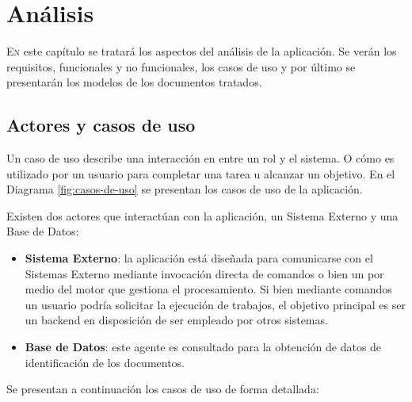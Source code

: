 
\chapter{Análisis}
\label{chap:analisis}

\lettrine{E}{n} este capítulo se tratará los aspectos del análisis de la aplicación. Se verán los requisitos, funcionales y no funcionales, los casos de uso y por último se presentarán los modelos de los documentos tratados.

\section{Actores y casos de uso}

Un caso de uso describe una interacción en entre un rol y el sistema. O cómo es utilizado por un usuario para completar una tarea u alcanzar un objetivo. En el Diagrama \ref{fig:casos-de-uso} se presentan los casos de uso de la aplicación. 

Existen dos actores que interactúan con la aplicación, un Sistema Externo y una Base de Datos:

\begin{itemize}
	\item \textbf{Sistema Externo}: la aplicación está diseñada para comunicarse con el Sistemas Externo mediante invocación directa de comandos o bien un por medio del motor que gestiona el procesamiento. Si bien mediante comandos un usuario podría solicitar la ejecución de trabajos, el objetivo principal es ser un backend en disposición de ser empleado por otros sistemas.
	\item \textbf{Base de Datos}: este agente es consultado para la obtención de datos de identificación de los documentos.
\end{itemize}

Se presentan a continuación los casos de uso de forma detallada:

